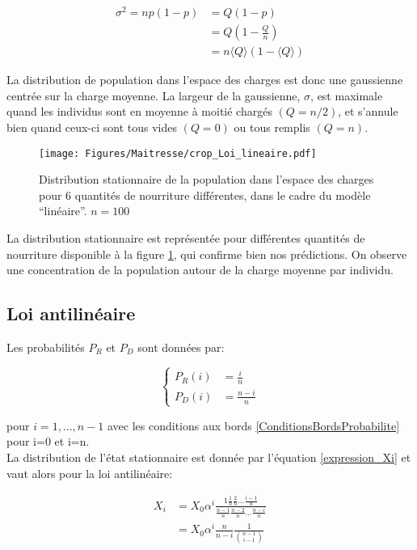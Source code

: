 \begin{equation}
\begin{aligned}
\sigma^2 = np(1-p) &= Q(1-p)\\
		&= Q(1-\frac{Q}{n})\\
		&= n\langle Q \rangle(1-\langle Q \rangle)
\end{aligned}
\end{equation}

La distribution de population dans l'espace des charges est donc une gaussienne centrée sur la charge moyenne. La largeur de la gaussienne, $\sigma$, est maximale quand les individus sont en moyenne à moitié chargés $(Q=n/2)$, et s'annule bien quand ceux-ci sont tous vides $(Q=0)$ ou tous remplis $(Q=n)$.


\begin{figure}[h]
\centering
\texttt{[image: Figures/Maitresse/crop\_Loi\_lineaire.pdf]}
\caption{Distribution stationnaire de la population dans l'espace des charges pour 6 quantités de nourriture différentes, dans le cadre du modèle ``linéaire''. $n=100$}
\label{DistribAnalytiqueLin}
\end{figure}

La distribution stationnaire est représentée pour différentes quantités de nourriture disponible à la figure \ref{DistribAnalytiqueLin}, qui confirme bien nos prédictions. On observe une concentration de la population autour de la charge moyenne par individu.



\subsection{Loi antilinéaire}
Les probabilités $P_R$ et $P_D$ sont données par:

\begin{equation}
\left \{
\begin{aligned}
P_R(i) &= \frac{i}{n}\\
P_D(i) &= \frac{n-i}{n}
\end{aligned}
\right.
\end{equation}

pour $i=1,...,n-1$ avec les conditions aux bords \ref{ConditionsBordsProbabilite} pour i=0 et i=n.\\

La distribution de l'état stationnaire est donnée par l'équation \ref{expression_Xi} et vaut alors pour la loi antilinéaire:

\begin{equation}
\begin{aligned}
X_i&=X_0 \alpha^i \frac{1\frac{1}{n}\frac{2}{n}...\frac{i-1}{n}}{\frac{n-1}{n}\frac{n-2}{n}...\frac{n-i}{n}}\\
&=X_0 \alpha^i \frac{n}{n-i}\frac{1}{\binom{n-1}{i-1}}
\end{aligned}
\end{equation}

